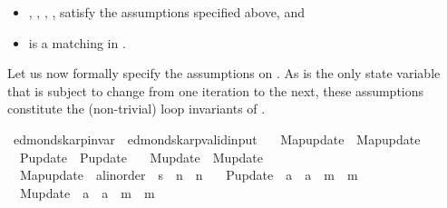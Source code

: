 \begin{isabellebody}
\begin{isamarkuptext}
%
\begin{itemize}%
\item {}, , , ,  satisfy the assumptions specified above, and

\item {} is a matching in .%
\end{itemize}


Let us now formally specify the assumptions on . As  is the only state variable
that is subject to change from one iteration to the next, these assumptions constitute the
(non-trivial) loop invariants of .%
\end{isamarkuptext}\isamarkuptrue%
\isamarkupfalse%
\ edmonds{\isacharunderscore}{\kern0pt}karp{\isacharunderscore}{\kern0pt}invar\ {\isacharequal}{\kern0pt}\ edmonds{\isacharunderscore}{\kern0pt}karp{\isacharunderscore}{\kern0pt}valid{\isacharunderscore}{\kern0pt}input\ \isanewline
\ \ Map{\isacharunderscore}{\kern0pt}update\ {\isacharequal}{\kern0pt}\ Map{\isacharunderscore}{\kern0pt}update\ \isanewline
\ \ P{\isacharunderscore}{\kern0pt}update\ {\isacharequal}{\kern0pt}\ P{\isacharunderscore}{\kern0pt}update\ \isanewline
\ \ M{\isacharunderscore}{\kern0pt}update\ {\isacharequal}{\kern0pt}\ M{\isacharunderscore}{\kern0pt}update\ \isanewline
\ \ Map{\isacharunderscore}{\kern0pt}update\ {\isacharcolon}{\kern0pt}{\isacharcolon}{\kern0pt}\ {\isachardoublequoteopen}{\isacharprime}{\kern0pt}a{\isacharcolon}{\kern0pt}{\isacharcolon}{\kern0pt}linorder\ {\isasymRightarrow}\ {\isacharprime}{\kern0pt}s\ {\isasymRightarrow}\ {\isacharprime}{\kern0pt}n\ {\isasymRightarrow}\ {\isacharprime}{\kern0pt}n{\isachardoublequoteclose}\ \isanewline
\ \ P{\isacharunderscore}{\kern0pt}update\ {\isacharcolon}{\kern0pt}{\isacharcolon}{\kern0pt}\ {\isachardoublequoteopen}{\isacharprime}{\kern0pt}a\ {\isasymRightarrow}\ {\isacharprime}{\kern0pt}a\ {\isasymRightarrow}\ {\isacharprime}{\kern0pt}m\ {\isasymRightarrow}\ {\isacharprime}{\kern0pt}m{\isachardoublequoteclose}\ \isanewline
\ \ M{\isacharunderscore}{\kern0pt}update\ {\isacharcolon}{\kern0pt}{\isacharcolon}{\kern0pt}\ {\isachardoublequoteopen}{\isacharprime}{\kern0pt}a\ {\isasymRightarrow}\ {\isacharprime}{\kern0pt}a\ {\isasymRightarrow}\ {\isacharprime}{\kern0pt}m\ {\isasymRightarrow}\ {\isacharprime}{\kern0pt}m{\isachardoublequoteclose}\ {\isacharplus}{\kern0pt}\isanewline

\end{isabellebody}
